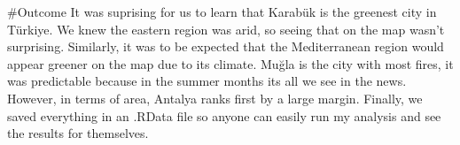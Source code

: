 \documentclass[
  11pt,
  a4paper,
  DIV=11,
  numbers=noendperiod]{scrartcl}
\begin{document}
\#Outcome It was suprising for us to learn that Karabük is the greenest
city in Türkiye. We knew the eastern region was arid, so seeing that on
the map wasn't surprising. Similarly, it was to be expected that the
Mediterranean region would appear greener on the map due to its climate.
Muğla is the city with most fires, it was predictable because in the
summer months its all we see in the news. However, in terms of area,
Antalya ranks first by a large margin. Finally, we saved everything in
an .RData file so anyone can easily run my analysis and see the results
for themselves.
\end{document}
